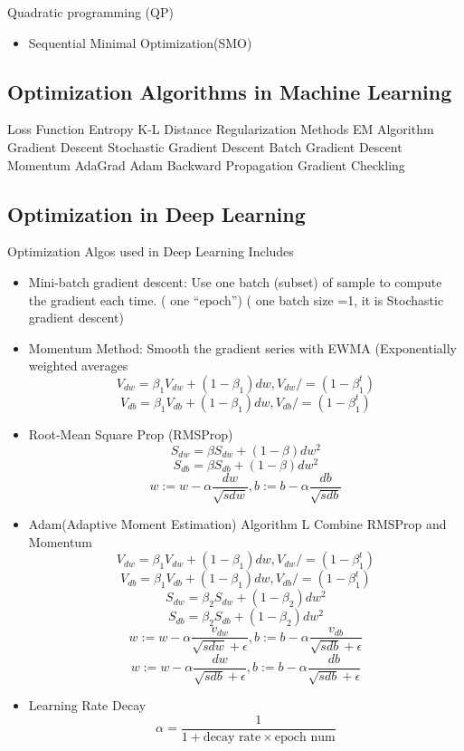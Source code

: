 \documentclass[11pt, openany]{book}              %
\begin{document}
Quadratic programming (QP)

\begin{itemize}
    \item Sequential Minimal Optimization(SMO) 
\end{itemize}

\subsection{Optimization Algorithms in Machine Learning}

		Loss Function
			Entropy
			K-L Distance
		Regularization Methods
		EM Algorithm
		Gradient Descent
			Stochastic Gradient Descent
			Batch Gradient Descent
			Momentum
			AdaGrad
			Adam
		Backward Propagation
		Gradient Checkling
		
\subsection{Optimization in Deep Learning}

Optimization Algos used in Deep Learning Includes

\begin{itemize}
	\item Mini-batch gradient descent: Use one batch (subset) of sample to compute the gradient each time. ( one “epoch”) ( one batch size =1, it is Stochastic gradient descent)
	\item Momentum Method: Smooth the gradient series with EWMA (Exponentially weighted averages 
	$$ V_{dw} = \beta_1V_{dw} + (1-\beta_1) dw, V_{dw} /= (1-\beta_1^t)$$
 	$$ V_{db} = \beta_1V_{db} + (1-\beta_1) dw,V_{db} /= (1-\beta_1^t)$$
 	\item Root-Mean Square Prop (RMSProp)
 	$$ S_{dw} = \beta S_{dw} + (1-\beta) dw^2 $$
 	$$ S_{db} = \beta S_{db} + (1-\beta) dw^2 $$
	$$ w:= w- \alpha \frac{dw}{\sqrt{sdw}}, b:= b- \alpha \frac{db}{\sqrt{sdb}}$$
	\item Adam(Adaptive Moment Estimation) Algorithm L Combine RMSProp and Momentum
	$$ V_{dw} = \beta_1V_{dw} + (1-\beta_1) dw, V_{dw} /= (1-\beta_1^t)$$
 	$$ V_{db} = \beta_1V_{db} + (1-\beta_1) dw,V_{db} /= (1-\beta_1^t)$$
 	$$ S_{dw} = \beta_2S_{dw} + (1-\beta_2) dw^2 $$
 	$$ S_{db} = \beta_2S_{db} + (1-\beta_2) dw^2 $$
	$$w:= w- \alpha \frac{v_{dw}}{\sqrt{sdw}+\epsilon}, b:= b- \alpha \frac{v_{db}}{\sqrt{sdb}+\epsilon}$$
	$$w:= w- \alpha \frac{dw}{\sqrt{sdb}+\epsilon}, b:= b- \alpha \frac{db}{\sqrt{sdb}+\epsilon}$$
	\item Learning Rate Decay
		$$ \alpha = \frac{1}{1+\text{decay rate} \times \text{epoch num}}$$	
\end{itemize}
\end{document}
